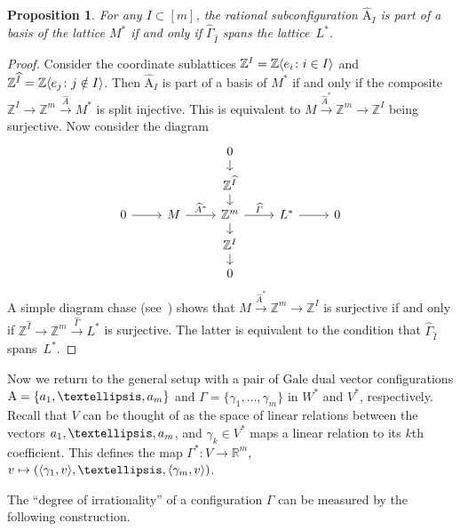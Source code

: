 \documentclass[a4paper]{amsart}
\newtheorem{proposition}[theorem]{Proposition}
\theoremstyle{definition}
\theoremstyle{remark}
\numberwithin{equation}{section}
\def\R{\mathbb R}
\def\R{\mathbb R}
\def\Z{\mathbb Z}
\newcommand{\mb}[1]{{\textbf {\textit#1}}}
\newcommand{\<}{\langle}
\renewcommand{\>}{\rangle}
\begin{document}
\begin{proposition}\label{rgaleindspan}
For any $I\subset[m]$, the rational subconfiguration $\widehat{\mathrm{A}}_I$ is part of a basis of the lattice $M^*$ if and only if $\widehat{\Gamma}_{\widehat I}$ spans the lattice~$L^*$.  
\end{proposition}
\begin{proof}
Consider the coordinate sublattices $\Z^I=\Z\langle\mb e_i\colon i\in I\rangle$ and
$\Z^{\widehat I}=\Z\langle\mb e_j\colon j\notin I\rangle$. Then 
$\widehat{\mathrm{A}}_I$ is part of a basis of $M^*$ if and only if the composite 
$\Z^I\to\Z^m\xrightarrow{\widehat A} M^*$ is split injective. This is equivalent to 
$M\xrightarrow{{\widehat A}^*}\Z^m\to\Z^I$ being surjective. Now consider the diagram
\[
\begin{tikzcd}[row sep=small]
  &&0 \ar{d}\\
  &&\Z^{\widehat I} \ar{d}\\
  0\ar{r} & M \ar{r}{{\widehat A}^*} & \Z^m \ar{d} \ar{r}{\widehat{\varGamma}}
  & L^*\ar{r} & 0\\
  &&\Z^I \ar{d}\\
  &&0
\end{tikzcd}
\]
A simple diagram chase (see~\cite[Lemma~1.2.5]{bu-pa15}) shows that $M\xrightarrow{{\widehat A}^*}\Z^m\to\Z^I$ is surjective if and only if
$\Z^{\widehat I}\to\Z^m\xrightarrow{\widehat\varGamma}L^*$ is surjective. The latter is equivalent to the condition that $\widehat{\Gamma}_{\widehat I}$ spans~$L^*$.
\end{proof}

Now we return to the general setup with a pair of Gale dual vector configurations 
$\mathrm A=\{\mb a_1,\ldots,\mb a_m\}$ and $\Gamma=\{\gamma_1,\ldots,\gamma_m\}$ in $W^*$ and $V^*$, respectively. Recall that $V$ can be thought of as the space of linear relations between the vectors $\mb a_1,\ldots,\mb a_m$, and $\gamma_k\in V^*$ maps a linear relation to its $k$th coefficient. This defines the map $\varGamma^*\colon V\to\R^m$, $\mb v\mapsto(\langle\gamma_1,\mb v\rangle,\ldots,\langle\gamma_m,\mb v\rangle)$.

The ``degree of  irrationality'' of a configuration $\Gamma$ can be measured by the following construction.
\end{document}

